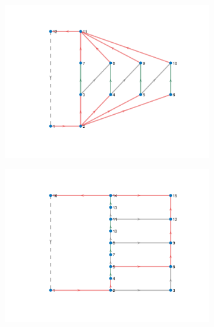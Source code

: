 \documentclass{article}
\begin{document}
\begin{figure}[htbp]
  \centering
  \begin{subfigure}[b]{0.3\textwidth}
    \includegraphics[width=\textwidth]{../attachments/f-dege-mac-4.png}
    \caption{}
    \label{fig:d-structure-f4}
  \end{subfigure}
  \hspace{0.05\textwidth}
  \begin{subfigure}[b]{0.3\textwidth}
    \includegraphics[width=\textwidth]{../attachments/e-dege-mac-4.png}
    \caption{}
    \label{fig:d-structure-e4}
  \end{subfigure}
  \hspace{0.05\textwidth}
  \begin{subfigure}[b]{0.45\textwidth}

\end{subfigure}
\end{figure}
\end{document}
